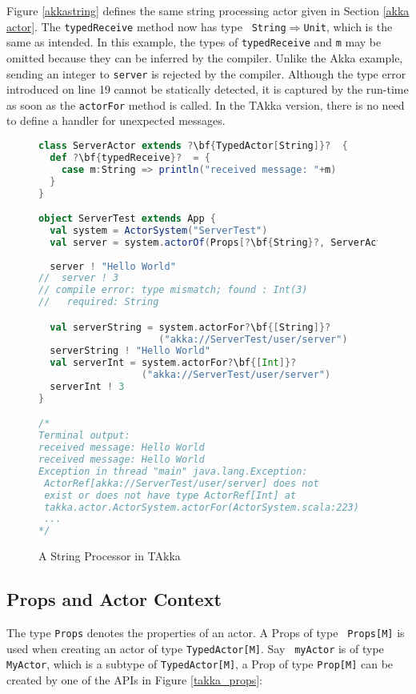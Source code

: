 Figure \ref{akkastring} defines the same string processing actor given in
Section \ref{akka actor}.  The {\tt typedReceive} method now has type {\tt 
String$\Rightarrow$Unit}, which is the same as intended.  In this example, the 
types of {\tt typedReceive} and {\tt m} may be omitted because they 
can be inferred by the compiler.  Unlike the Akka example, sending an integer 
to {\tt server} is rejected by the compiler.  Although the type error 
introduced on line 19 cannot be statically detected, it is captured by the 
run-time as soon as the {\tt actorFor} method is called.  In the TAkka version, 
there is no need to define a handler for unexpected messages.

\begin{figure}
\label{takkastring}
      \begin{lstlisting}[language=scala, escapechar=?]
class ServerActor extends ?\bf{TypedActor[String]}?  {
  def ?\bf{typedReceive}?  = {
    case m:String => println("received message: "+m)
  }
}

object ServerTest extends App {
  val system = ActorSystem("ServerTest")
  val server = system.actorOf(Props[?\bf{String}?, ServerActor], "server")
  
  server ! "Hello World"
//  server ! 3
// compile error: type mismatch; found : Int(3)
//   required: String

  val serverString = system.actorFor?\bf{[String]}?
                     ("akka://ServerTest/user/server")
  serverString ! "Hello World"
  val serverInt = system.actorFor?\bf{[Int]}?
                  ("akka://ServerTest/user/server")
  serverInt ! 3
}

/*
Terminal output:
received message: Hello World
received message: Hello World
Exception in thread "main" java.lang.Exception: 
 ActorRef[akka://ServerTest/user/server] does not 
 exist or does not have type ActorRef[Int] at 
 takka.actor.ActorSystem.actorFor(ActorSystem.scala:223)
 ...
*/
    \end{lstlisting}
    \caption{A String Processor in TAkka}
\end{figure}

\subsection{Props and Actor Context}
\label{actor_context}
The type {\tt Props} denotes the properties of an actor.   A Props of type {\tt 
Props[M]} is used when creating an actor of type {\tt TypedActor[M]}.  Say {\tt 
myActor} is of type {\tt MyActor}, which is a subtype of {\tt TypedActor[M]}, a 
Prop of type {\tt Prop[M]} can be created by one of the APIs in Figure 
\ref{takka_props}:

